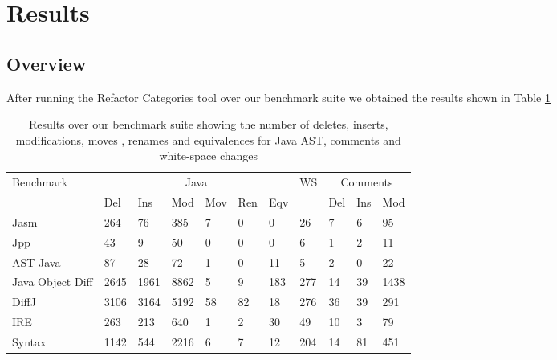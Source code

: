 

\section{Results}
\subsection{Overview}
After running the Refactor Categories tool over our benchmark suite we obtained the results shown in Table \ref{tab:results}

\begin{table}[t!]
    \begin{tabular}{l|llllll|l|lll}
    Benchmark        & \multicolumn{6}{|c|}{Java}           & WS & \multicolumn{3}{|c}{Comments} \\ \cline{2-7} \cline{9-11}
    ~                & Del  & Ins  & Mod  & Mov & Ren & Eqv & ~          & Del      & Ins & Mod  \\ \hline
    Jasm             & 264  & 76   & 385  & 7   & 0   & 0   & 26         & 7        & 6   & 95   \\
    Jpp              & 43   & 9    & 50   & 0   & 0   & 0   & 6          & 1        & 2   & 11   \\
    AST Java         & 87   & 28   & 72   & 1   & 0   & 11  & 5          & 2        & 0   & 22   \\
    \begin{minipage}[t]{0.15\textwidth}Java Object Diff\end{minipage} & 2645 & 1961 & 8862 & 5   & 9   & 183 & 277        & 14       & 39  & 1438 \\
    DiffJ            & 3106 & 3164 & 5192 & 58  & 82  & 18  & 276        & 36       & 39  & 291  \\
    IRE              & 263  & 213  & 640  & 1   & 2   & 30  & 49         & 10       & 3   & 79   \\
    Syntax           & 1142 & 544  & 2216 & 6   & 7   & 12  & 204        & 14       & 81  & 451  \\
    \end{tabular}
    \caption{Results over our benchmark suite showing the number of deletes, inserts, modifications, moves , renames and equivalences for Java AST, comments and white-space changes}
    \label{tab:results}
\end{table}

